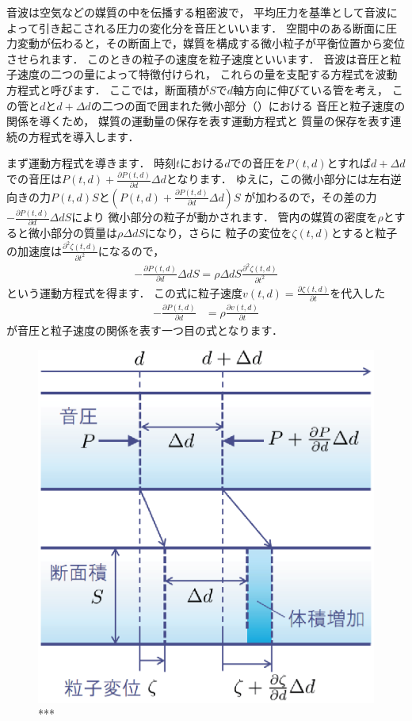 音波は空気などの媒質の中を伝播する粗密波で，
平均圧力を基準として音波によって引き起こされる圧力の変化分を音圧といいます．
空間中のある断面に圧力変動が伝わると，その断面上で，媒質を構成する微小粒子が平衡位置から変位させられます．
このときの粒子の速度を粒子速度といいます．
音波は音圧と粒子速度の二つの量によって特徴付けられ，
これらの量を支配する方程式を波動方程式と呼びます．
ここでは，断面積が$S$で$d$軸方向に伸びている管を考え，
この管と$d$と$d+\Delta d$の二つの面で囲まれた微小部分（）における
音圧と粒子速度の関係を導くため，
媒質の運動量の保存を表す運動方程式と
質量の保存を表す連続の方程式を導入します．


まず運動方程式を導きます．
時刻$t$における$d$での音圧を$P(t,d)$とすれば$d+\Delta d$での音圧は$P(t,d) + \frac{\partial P(t,d)}{\partial d} \Delta d$となります．
ゆえに，この微小部分には左右逆向きの力$P(t,d)S$と$(P(t,d) + \frac{\partial P(t,d)}{\partial d} \Delta d)S$
が加わるので，その差の力$- \frac{\partial P(t,d)}{\partial d} \Delta d S$により
微小部分の粒子が動かされます．
管内の媒質の密度を$\rho$とすると微小部分の質量は$\rho\Delta d S$になり，さらに
粒子の変位を$\zeta(t,d)$とすると粒子の加速度は$\frac{\partial^2 \zeta(t,d)}{\partial t^2}$になるので，
\begin{align}
-\frac{\partial P(t,d)}{\partial d}\Delta d S = \rho \Delta d S \frac{\partial^2 \zeta(t,d)}{\partial t^2}
\end{align}
という運動方程式を得ます．
この式に粒子速度$v(t,d) = \frac{\partial \zeta(t,d)}{\partial t}$を代入した
\begin{align}
-\frac{\partial P(t,d)}{\partial d} &= \rho \frac{\partial v(t,d)}{\partial t}
\label{eq:moteq}
\end{align}
が音圧と粒子速度の関係を表す一つ目の式となります．

\begin{figure}[t!]
\centering
\includegraphics[width=.55\linewidth,keepaspectratio=true]{sections/speech/acoustictube.eps}
\vspace{0ex}
 \caption{***}
\label{fig:waveq}
\vspace{0ex}
\end{figure}


